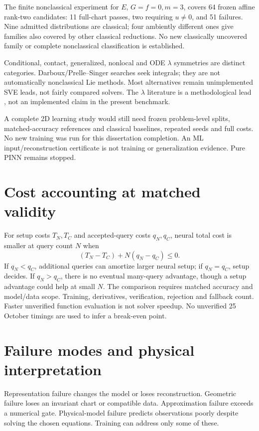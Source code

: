 \documentclass[11pt,a4paper,oneside]{report}
\numberwithin{equation}{chapter}
\begin{document}
The finite nonclassical experiment for $E$, $G=f=0,m=3$, covers 64 frozen
affine rank-two candidates: 11 full-chart passes, two requiring $u\ne0$,
and 51 failures. Nine admitted distributions are classical; four ambiently
different ones give families also covered by other classical reductions.
No new classically uncovered family or complete nonclassical classification
is established.

Conditional, contact, generalized, nonlocal and ODE $\lambda$ symmetries
are distinct categories. Darboux/Prelle--Singer searches seek integrals;
they are not automatically nonclassical Lie methods.
Most alternatives remain unimplemented SVE leads, not fairly compared
solvers. The $\lambda$ literature is a methodological lead \cite{muriel},
not an implemented claim in the present benchmark.

A complete 2D learning study would still need frozen problem-level splits,
matched-accuracy references and classical baselines, repeated seeds and
full costs. No new training was run for this dissertation completion.
An ML input/reconstruction certificate is not training or generalization
evidence. Pure PINN remains stopped.

\section{Cost accounting at matched validity}
For setup costs $T_N,T_C$ and accepted-query costs $q_N,q_C$, neural total
cost is smaller at query count $N$ when
\begin{equation}\label{eq:cost}
(T_N-T_C)+N(q_N-q_C)\le0.
\end{equation}
If $q_N<q_C$, additional queries can amortize larger neural setup; if
$q_N=q_C$, setup decides. If $q_N>q_C$, there is no eventual many-query
advantage, though a setup advantage could help at small $N$.
The comparison requires matched accuracy and model/data scope.
Training, derivatives, verification, rejection and fallback count.
Faster unverified function evaluation is not solver speedup.
No unverified 25 October timings are used to infer a break-even point.

\section{Failure modes and physical interpretation}
Representation failure changes the model or loses reconstruction.
Geometric failure loses an invariant chart or compatible data.
Approximation failure exceeds a numerical gate.
Physical-model failure predicts observations poorly despite solving the
chosen equations. Training can address only some of these.
\end{document}
